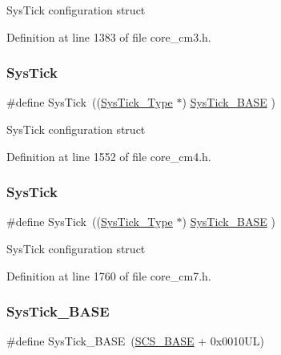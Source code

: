 Sys\+Tick configuration struct 

Definition at line 1383 of file core\+\_\+cm3.\+h.

\mbox{\label{group___c_m_s_i_s__core__base_gacd96c53beeaff8f603fcda425eb295de}} 
\subsubsection{\texorpdfstring{Sys\+Tick}{SysTick}\hspace{0.1cm}{\footnotesize\ttfamily [6/7]}}
{\footnotesize\ttfamily \#define Sys\+Tick~((\hyperlink{struct_sys_tick___type}{Sys\+Tick\+\_\+\+Type}   $\ast$)     \hyperlink{group___c_m_s_i_s__core__base_ga58effaac0b93006b756d33209e814646}{Sys\+Tick\+\_\+\+B\+A\+SE}  )}

Sys\+Tick configuration struct 

Definition at line 1552 of file core\+\_\+cm4.\+h.

\mbox{\label{group___c_m_s_i_s__core__base_gacd96c53beeaff8f603fcda425eb295de}} 
\subsubsection{\texorpdfstring{Sys\+Tick}{SysTick}\hspace{0.1cm}{\footnotesize\ttfamily [7/7]}}
{\footnotesize\ttfamily \#define Sys\+Tick~((\hyperlink{struct_sys_tick___type}{Sys\+Tick\+\_\+\+Type}   $\ast$)     \hyperlink{group___c_m_s_i_s__core__base_ga58effaac0b93006b756d33209e814646}{Sys\+Tick\+\_\+\+B\+A\+SE}  )}

Sys\+Tick configuration struct 

Definition at line 1760 of file core\+\_\+cm7.\+h.

\mbox{\label{group___c_m_s_i_s__core__base_ga58effaac0b93006b756d33209e814646}} 
\subsubsection{\texorpdfstring{Sys\+Tick\+\_\+\+B\+A\+SE}{SysTick\_BASE}\hspace{0.1cm}{\footnotesize\ttfamily [1/7]}}
{\footnotesize\ttfamily \#define Sys\+Tick\+\_\+\+B\+A\+SE~(\hyperlink{group___c_m_s_i_s__core__base_ga3c14ed93192c8d9143322bbf77ebf770}{S\+C\+S\+\_\+\+B\+A\+SE} +  0x0010\+U\+L)}

